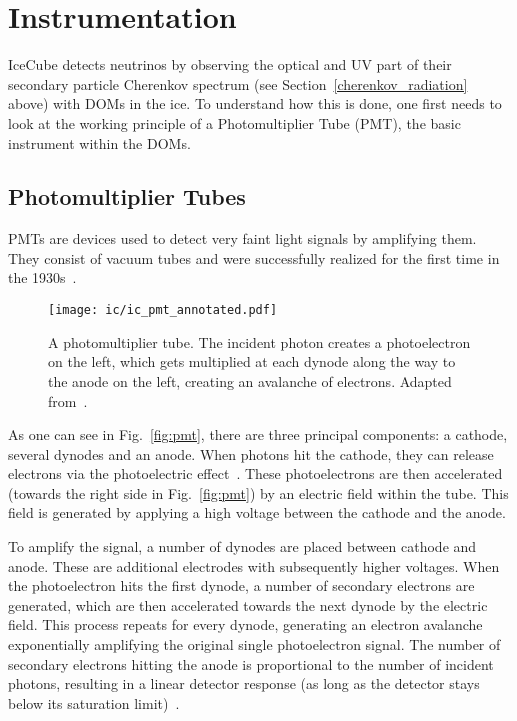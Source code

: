 \section{Instrumentation}

IceCube detects neutrinos by observing the optical and UV part of their secondary particle Cherenkov spectrum (see Section~\ref{cherenkov_radiation} above) with DOMs in the ice. To understand how this is done, one first needs to look at the working principle of a Photomultiplier Tube (PMT), the basic instrument within the DOMs.

\subsection{Photomultiplier Tubes}
PMTs are devices used to detect very faint light signals by amplifying them. They consist of vacuum tubes and were successfully realized for the first time in the 1930s~.

\begin{figure}[h!]
    \texttt{[image: ic/ic\_pmt\_annotated.pdf]}
    \caption[PMT schematic]{A photomultiplier tube. The incident photon creates a photoelectron on the left, which gets multiplied at each dynode along the way to the anode on the left, creating an avalanche of electrons. Adapted from~\cite{Bednarski2014}.}
\end{figure}

As one can see in Fig.~\ref{fig:pmt}, there are three principal components: a cathode, several dynodes and an anode. When photons hit the cathode, they can release electrons via the photoelectric effect~. These photoelectrons are then accelerated (towards the right side in Fig.~\ref{fig:pmt}) by an electric field within the tube. This field is generated by applying a high voltage between the cathode and the anode.

To amplify the signal, a number of dynodes are placed between cathode and anode. These are additional electrodes with subsequently higher voltages. When the photoelectron hits the first dynode, a number of secondary electrons are generated, which are then accelerated towards the next dynode by the electric field. This process repeats for every dynode, generating an electron avalanche exponentially amplifying the original single photoelectron signal. The number of secondary electrons hitting the anode is proportional to the number of incident photons, resulting in a linear detector response (as long as the detector stays below its saturation limit)~.

